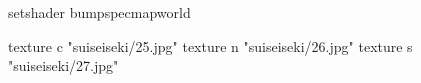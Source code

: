 setshader bumpspecmapworld

    texture c "suiseiseki/25.jpg"
    texture n "suiseiseki/26.jpg"
    texture s "suiseiseki/27.jpg"

